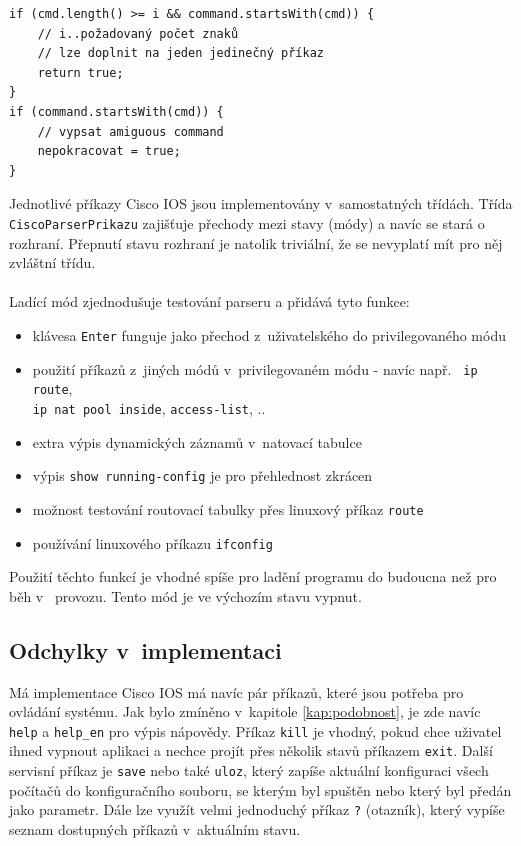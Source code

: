 \begin{verbatim}
if (cmd.length() >= i && command.startsWith(cmd)) {
    // i..požadovaný počet znaků 
    // lze doplnit na jeden jedinečný příkaz
    return true;
}
if (command.startsWith(cmd)) {
    // vypsat amiguous command
    nepokracovat = true;
}
\end{verbatim}

Jednotlivé příkazy Cisco IOS jsou implementovány v~samostatných třídách. Třída \\\verb|CiscoParserPrikazu| zajišťuje přechody mezi stavy (módy) a navíc se stará o~ rozhraní. Přepnutí stavu rozhraní je natolik triviální, že se nevyplatí mít pro něj zvláštní třídu. 

\paragraph{}
Ladící mód zjednodušuje testování parseru a přidává tyto funkce:
\begin{itemize}
 \item klávesa \verb|Enter| funguje jako přechod z~uživatelského do privilegovaného módu
 \item použití příkazů z~jiných módů v~privilegovaném módu - navíc např. \verb| ip route|, \\\verb|ip nat pool inside|, \verb|access-list|, ..
 \item extra výpis dynamických záznamů v~natovací tabulce
 \item výpis \verb|show running-config| je pro přehlednost zkrácen
 \item možnost testování routovací tabulky přes linuxový příkaz \verb|route|
 \item používání linuxového příkazu \verb|ifconfig|
\end{itemize}
Použití těchto funkcí je vhodné spíše pro ladění programu do budoucna než pro běh v~ provozu. Tento mód je ve výchozím stavu vypnut.


\subsection{Odchylky v~implementaci}
Má implementace Cisco IOS má navíc pár příkazů, které jsou potřeba pro ovládání systému. Jak bylo zmíněno v~kapitole \ref{kap:podobnost}, je zde navíc \verb|help| a \verb|help_en| pro výpis nápovědy. Příkaz \verb|kill| je vhodný, pokud chce uživatel ihned vypnout aplikaci a nechce projít přes několik stavů příkazem \verb|exit|. Další servisní příkaz je \verb|save| nebo také \verb|uloz|, který zapíše aktuální konfiguraci všech počítačů do konfiguračního souboru, se kterým byl spuštěn nebo který byl předán jako parametr. Dále lze využít velmi jednoduchý příkaz \verb|?| (otazník), který vypíše seznam dostupných příkazů v~aktuálním stavu.


